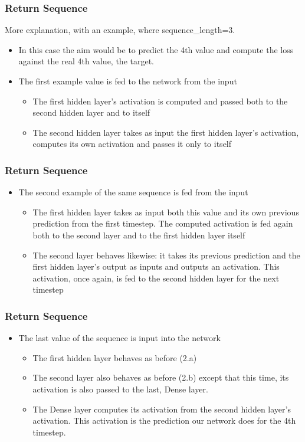 \begin{frame}[fragile] \frametitle{Return Sequence}
More explanation, with an example, where sequence\_length=3.
\begin{itemize}
\item In this case the aim would be to predict the 4th value and compute the loss against the real 4th value, the target.
\item The first example value is fed to the network from the input
\begin{itemize}
\item The first hidden layer's activation is computed and passed both to the second hidden layer and to itself
\item The second hidden layer takes as input the first hidden layer's activation, computes its own activation and passes it only to itself
\end{itemize}
\end{itemize}
\end{frame}

\begin{frame}[fragile] \frametitle{Return Sequence}
\begin{itemize}
\item The second example of the same sequence is fed from the input
\begin{itemize}
\item The first hidden layer takes as input both this value and its own previous prediction from the first timestep. The computed activation is fed again both to the second layer and to the first hidden layer itself
\item The second layer behaves likewise: it takes its previous prediction and the first hidden layer's output as inputs and outputs an activation. This activation, once again, is fed to the second hidden layer for the next timestep
\end{itemize}
\end{itemize}
\end{frame}

\begin{frame}[fragile] \frametitle{Return Sequence}
\begin{itemize}
\item The last value of the sequence is input into the network
\begin{itemize}
\item The first hidden layer behaves as before (2.a)
\item The second layer also behaves as before (2.b) except that this time, its activation is also passed to the last, Dense layer.
\item The Dense layer computes its activation from the second hidden layer's activation. This activation is the prediction our network does for the 4th timestep.
\end{itemize}
\end{itemize}
\end{frame}

